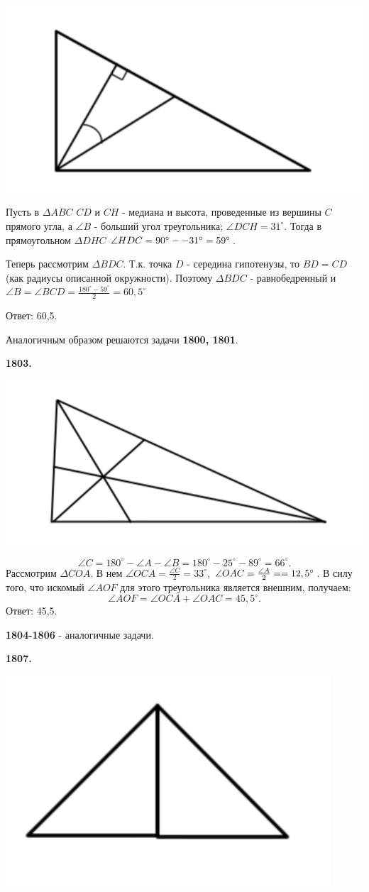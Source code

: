 {\centering \includegraphics[width=0.5\linewidth]{Geometry/Content/13.png}
	
}

Пусть в $\Delta ABC$ $CD$ и $CH$ - медиана и высота, проведенные из вершины $C$ прямого угла, а $\angle B$ - больший угол треугольника; $\angle DCH = 31^\circ$. Тогда в прямоугольном $\Delta DHC$ $\angle HDC = 90^\circ - \linebreak -31^\circ = 59^\circ$. 

Теперь рассмотрим $\Delta BDC$. Т.к. точка $D$ - середина гипотенузы, то $BD = CD$ (как радиусы описанной окружности). Поэтому $\Delta BDC$ - равнобедренный и $\angle B = \angle BCD = \frac{180^\circ - 59^\circ}{2} = 60,5^\circ$

 \null \hspace*{\fill} Ответ: 60,5.

Аналогичным образом решаются задачи \textbf{1800, 1801}. 

\textbf{1803.}

{\centering \includegraphics[width=0.5\linewidth]{Geometry/Content/14.png}
	
}
\[
\angle C = 180^\circ - \angle A - \angle B = 180^\circ - 25^\circ - 89^\circ = 66^\circ.
\]
 Рассмотрим $\Delta COA$. В нем $\angle OCA = \frac{\angle C}{2} = 33^\circ$, $\angle OAC = \frac{\angle A}{2} = \linebreak = 12,5^\circ$. В силу того, что искомый $\angle AOF$ для этого треугольника является внешним, получаем:
\[
\angle AOF = \angle OCA + \angle OAC = 45,5^\circ.
\] \null \hspace*{\fill} Ответ: 45,5. 

\textbf{1804-1806} - аналогичные задачи.

\textbf{1807.}

{\centering \includegraphics[width=0.4\linewidth]{Geometry/Content/15.png}
	
}


